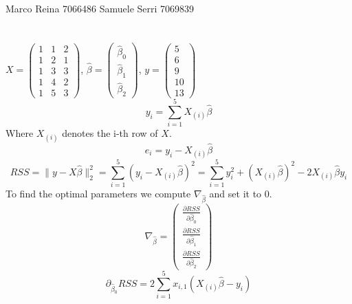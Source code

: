 \documentclass[12pt]{article}
\begin{document}
\section*{}
Marco Reina 7066486 \newline
Samuele Serri 7069839 \newline
\section*{}
$X = \begin{pmatrix}
1 & 1 & 2 \\ 1 & 2 & 1 \\ 1 & 3 & 3 \\ 1 & 4 & 2 \\ 1 & 5 & 3 
\end{pmatrix}$, $\hat\beta =  \begin{pmatrix}
    \hat\beta_0 \\ \hat\beta_1 \\ \hat\beta_2
\end{pmatrix}$, $y = \begin{pmatrix}
    5 \\ 6 \\ 9 \\ 10 \\ 13
\end{pmatrix}$
\begin{equation*}
    y_i = \sum_{i  = 1}^5X_{(i)}\hat\beta
\end{equation*}
Where $X_{(i)}$ denotes the i-th row of $X$.
\begin{equation*}
    e_i = y_i - X_{(i)}\hat\beta
\end{equation*}
\begin{equation*}
    RSS = \|y - X\hat\beta\|_2^2 = \sum_{i = 1}^5(y_i - X_{(i)}\hat\beta)^2 = \sum_{i = 1}^5y_i^2 + (X_{(i)}\hat\beta)^2 - 2X_{(i)}\hat\beta y_i
\end{equation*}
To find the optimal parameters we compute $\nabla_{\hat\beta}$ and set it to 0.
\begin{equation*}
    \nabla_{\hat\beta} = \begin{pmatrix}
        \frac{\partial RSS}{\partial\hat\beta_0} \\ \frac{\partial RSS}{\partial\hat\beta_1} \\ \frac{\partial RSS}{\partial\hat\beta_2}
    \end{pmatrix}
\end{equation*}
\begin{equation*}
    \partial_{\hat\beta_0}RSS = 2\sum_{i = 1}^{5}x_{i,1}(X_{(i)}\hat\beta - y_i)
\end{equation*}
\end{document}
